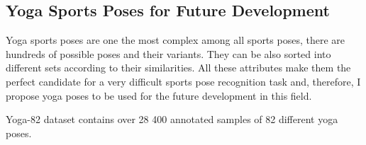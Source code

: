 \subsection{Yoga Sports Poses for Future Development}

Yoga sports poses are one the most complex among all sports poses, there are hundreds of possible poses and their variants. They can be also sorted into different sets according to their similarities. All these attributes make them the perfect candidate for a very difficult sports pose recognition task and, therefore, I propose yoga poses to be used for the future development in this field.

Yoga-82 dataset contains over 28 400 annotated samples of 82 different yoga poses.
\blindtext

\blindtext

\blindtext

\blindtext
